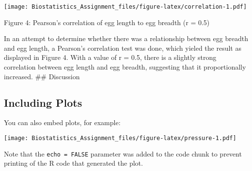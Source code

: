 \documentclass[]{article}
\newenvironment{Shaded}{\begin{snugshade}}{\end{snugshade}}
\newcommand{\KeywordTok}[1]{\textcolor[rgb]{0.13,0.29,0.53}{\textbf{#1}}}
\newcommand{\DataTypeTok}[1]{\textcolor[rgb]{0.13,0.29,0.53}{#1}}
\newcommand{\DecValTok}[1]{\textcolor[rgb]{0.00,0.00,0.81}{#1}}
\newcommand{\FloatTok}[1]{\textcolor[rgb]{0.00,0.00,0.81}{#1}}
\newcommand{\StringTok}[1]{\textcolor[rgb]{0.31,0.60,0.02}{#1}}
\newcommand{\OperatorTok}[1]{\textcolor[rgb]{0.81,0.36,0.00}{\textbf{#1}}}
\newcommand{\NormalTok}[1]{#1}
\begin{document}
\begin{Shaded}
\end{Shaded}

\texttt{[image: Biostatistics\_Assignment\_files/figure-latex/correlation-1.pdf]}

Figure 4: Pearson's correlation of egg length to egg breadth (r = 0.5)

In an attempt to determine whether there was a relationship between egg
breadth and egg length, a Pearson's correlation test was done, which
yieled the result as displayed in Figure 4. With a value of r = 0.5,
there is a slightly strong correlation between egg length and egg
breadth, suggesting that it proportionally increased. \#\# Discussion

\subsection{Including Plots}\label{including-plots}

You can also embed plots, for example:

\texttt{[image: Biostatistics\_Assignment\_files/figure-latex/pressure-1.pdf]}

Note that the \texttt{echo\ =\ FALSE} parameter was added to the code
chunk to prevent printing of the R code that generated the plot.
\end{document}
